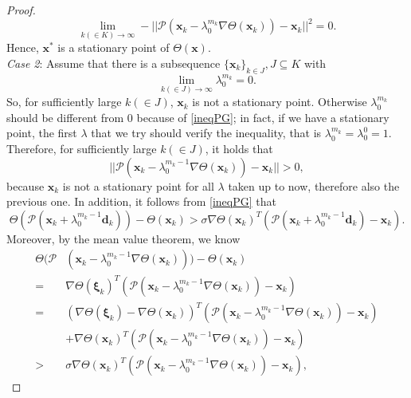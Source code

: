 \begin{proof}
\begin{equation*}
	\lim_{k (\in K) \rightarrow \infty} - ||\mathcal{P}(\textbf{x}_k  - \lambda_0^{m_k} \nabla \Theta (\textbf{x}_k)) - \textbf{x}_k||^ 2= 0.
	\end{equation*}
	Hence, $ \textbf{x}^* $ is a stationary point of $ \Theta (\textbf{x}) $.\\
	\textit{Case 2}: Assume that there is a subsequence $ \{\textbf{x}_k\}_{k \in J}, J \subseteq K $ with 
	\begin{equation*}
	\lim_{k (\in J) \rightarrow \infty}  \lambda_0^{m_k} = 0.
	\end{equation*}
	So, for sufficiently large $k(\in J)$, $\textbf{x}_k$ is not a stationary point. Otherwise $ \lambda_0^{m_k} $ should be different from 0 because of \eqref{ineqPG}; in fact, if we have a stationary point, the first $ \lambda $ that we try should verify the inequality, that is $ \lambda_0^{m_k} = \lambda_0^0 = 1 $.\\
	Therefore, for sufficiently large $k(\in J) $, it holds that 
	\begin{equation}
	\label{14P}
	||\mathcal{P}(\textbf{x}_k - \lambda_0^{m_{k} -1} \nabla \Theta (\textbf{x}_k)) - \textbf{x}_k|| > 0,
	\end{equation} 
	because $ \textbf{x}_k $ is not a stationary point for all $ \lambda $ taken up to now, therefore also the previous one.  In addition, it follows from \eqref{ineqPG} that 
	\begin{equation*}
	\Theta(\mathcal{P}(\textbf{x}_k+ \lambda_0^{m_{k}-1} \textbf{d}_k)) - \Theta (\textbf{x}_k) > \sigma \nabla \Theta(\textbf{x}_k)^T (\mathcal{P}(\textbf{x}_k + \lambda_0^{m_{k}-1} \textbf{d}_k)- \textbf{x}_k).
	\end{equation*}
	Moreover, by the mean value theorem, we know 
	\begin{align*}
	\Theta(\mathcal{P} & (\textbf{x}_k - \lambda_0^{m_{k}-1} \nabla \Theta(\textbf{x}_k))) - \Theta (\textbf{x}_k) \\
	= & \nabla \Theta(\bm{\xi}_k)^T (\mathcal{P}(\textbf{x}_k - \lambda_0^{m_{k}-1} \nabla \Theta(\textbf{x}_k))- \textbf{x}_k)\\
	= & (\nabla \Theta(\bm{\xi}_k) - \nabla \Theta(\textbf{x}_k))^T (\mathcal{P}(\textbf{x}_k - \lambda_0^{m_{k}-1} \nabla \Theta(\textbf{x}_k))- \textbf{x}_k)\\
	& + \nabla \Theta(\textbf{x}_k)^T (\mathcal{P}(\textbf{x}_k - \lambda_0^{m_{k}-1}\nabla \Theta(\textbf{x}_k))- \textbf{x}_k) \\
	> &\sigma \nabla \Theta(\textbf{x}_k)^T (\mathcal{P}(\textbf{x}_k - \lambda_0^{m_{k}-1} \nabla \Theta(\textbf{x}_k))- \textbf{x}_k),

\end{align*}
\end{proof}
